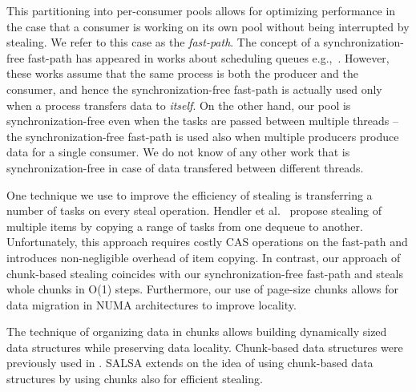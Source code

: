 This partitioning into per-consumer pools allows for optimizing performance in the case that a
consumer is working on its own pool without being interrupted by stealing. We refer to this case as
the \emph{fast-path}. The concept of a synchronization-free fast-path has appeared in works about
scheduling queues e.g.,~\cite{Arora:1998:TSM:277651.277678,Hendler:2006:DNW:1160290.1160294}.
However, these works assume that the same process is both the producer and the consumer, and
hence the synchronization-free fast-path is actually used only when a process transfers data to
\emph{itself}. On the other hand, our pool is synchronization-free even when the tasks are passed
between multiple threads -- the synchronization-free fast-path is used also when multiple producers
produce data for a single consumer. We do not know of any other work that is synchronization-free in
case of data transfered between different threads.

One technique we use to improve the efficiency of stealing is transferring a
number of tasks on every steal operation. Hendler et al.~\cite{Hendler:2002:NSW:571825.571876}
propose stealing of multiple items by copying a range of tasks from one dequeue to another.
Unfortunately, this approach requires costly CAS operations on the fast-path and introduces
non-negligible overhead of item copying. In contrast, our approach of chunk-based stealing
coincides with our synchronization-free fast-path and steals whole chunks in
O(1) steps. Furthermore, our use of page-size chunks allows for data migration in NUMA
architectures to improve locality.

The technique of organizing data in chunks allows building dynamically sized data structures while
preserving data locality. Chunk-based data structures were previously used
in \cite{Braginsky:2011:LLL:1946143.1946153, Gidenstam:2010:CLQ:1940234.1940266,
Hendler:2006:DNW:1160290.1160294, Sundell:2011:LAC:1989493.1989550}. SALSA extends on the idea of
using chunk-based data structures by using chunks also for efficient stealing.

